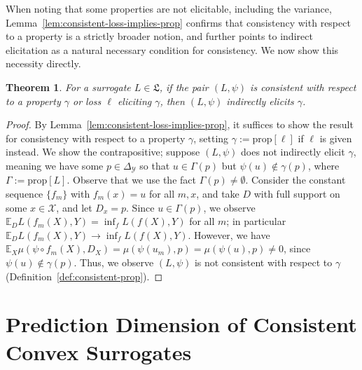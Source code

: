 \documentclass{article}
\newcommand{\Comments}{1}
\newcommand{\mynote}[2]{\ifnum\Comments=1\textcolor{#1}{#2}\fi}
\newcommand{\mytodo}[2]{\ifnum\Comments=1%
	\todo[linecolor=#1!80!black,backgroundcolor=#1,bordercolor=#1!80!black]{#2}\fi}
\newcommand{\raft}[1]{\mytodo{green!20!white}{RF: #1}}
\newcommand{\jessie}[1]{\mynote{purple}{[JF: #1]}}
\newcommand{\simplex}{\Delta_\Y}
\newcommand{\prop}[1]{\mathrm{prop}[#1]}
\newcommand{\propdis}{\mu}
\newcommand{\E}{\mathbb{E}}
\renewcommand{\L}{\mathfrak{L}}
\newcommand{\X}{\mathcal{X}}
\newcommand{\Y}{\mathcal{Y}}
\newtheorem{theorem}{Theorem}
\begin{document}
When noting that some properties are not elicitable, including the variance, Lemma~\ref{lem:consistent-loss-implies-prop} confirms that consistency with respect to a property is a strictly broader notion, and further points to indirect elicitation as a natural necessary condition for consistency.
We now show this necessity directly.

\begin{theorem}\label{thm:consistent-implies-indir-elic}
	For a surrogate $L \in \L$, if the pair $(L, \psi)$ is consistent with respect to a property $\gamma$ or loss $\ell$ eliciting $\gamma$, then $(L, \psi)$ indirectly elicits $\gamma$.
\end{theorem}
\begin{proof}
	By Lemma~\ref{lem:consistent-loss-implies-prop}, it suffices to show the result for consistency with respect to a property $\gamma$, setting $\gamma := \prop{\ell}$ if $\ell$ is given instead.
	We show the contrapositive; suppose $(L, \psi)$ does not indirectly elicit $\gamma$, meaning we have some $p \in \simplex$ so that $u \in \Gamma(p)$ but $\psi(u) \not \in \gamma(p)$, where $\Gamma := \prop{L}$.
	Observe that we use the fact $\Gamma(p) \neq \emptyset$.
	Consider the constant sequence $\{f_m\}$ with $f_m(x) = u$ for all $m,x$, and take $D$ with full support on some $x \in \X$, and let $D_x = p$.
  Since $u \in \Gamma(p)$, we observe $\E_D L(f_m(X), Y) = \inf_f L(f(X),Y)$ for all $m$; in particular $\E_D L(f_m(X), Y) \to \inf_f L(f(X),Y)$.
	However, we have $\E_X \propdis(\psi \circ f_m(X), D_X) = \propdis(\psi(u_m), p) = \propdis(\psi(u), p) \neq 0$, since $\psi(u) \not \in \gamma(p)$.
	Thus, we observe $(L, \psi)$ is not consistent with respect to $\gamma$ (Definition~\ref{def:consistent-prop}).
\end{proof}

\section{Prediction Dimension of Consistent Convex Surrogates}\label{sec:char-convex}
\end{document}
